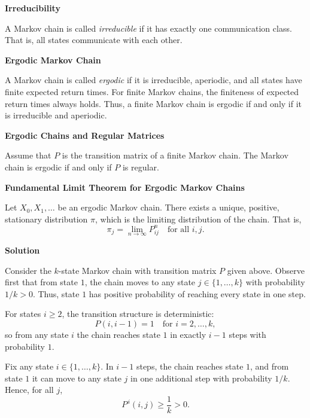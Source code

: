 \documentclass[hidelinks]{article}
\begin{document}
\medskip

{\noindent \color{darkgreen}
\textbf{Irreducibility}

\noindent A Markov chain is called \emph{irreducible} if it has exactly one communication class. 
That is, all states communicate with each other.
}

\medskip

{\noindent \color{darkgreen}
\textbf{Ergodic Markov Chain}

\noindent A Markov chain is called \emph{ergodic} if it is irreducible, aperiodic, and all states have finite expected return times. 
For finite Markov chains, the finiteness of expected return times always holds. 
Thus, a finite Markov chain is ergodic if and only if it is irreducible and aperiodic.
}

\medskip

{\color{darkgreen}

\noindent \textbf{Ergodic Chains and Regular Matrices}

\noindent Assume that $P$ is the transition matrix of a finite Markov chain.
The Markov chain is ergodic if and only if $P$ is regular.
}

\medskip

{\noindent \color{darkgreen}
\textbf{Fundamental Limit Theorem for Ergodic Markov Chains}

\noindent Let $X_0, X_1, \dots$ be an ergodic Markov chain. There exists a unique, positive, stationary distribution $\pi$, which is the limiting distribution of the chain. That is,
\[
\pi_j = \lim_{n \to \infty} P_{ij}^n \quad \text{for all } i,j.
\]
}

\noindent \textbf{Solution}

\noindent Consider the $k$-state Markov chain with transition matrix $P$ given above.
Observe first that from state $1$, the chain moves to any state
$j \in \{1,\dots,k\}$ with probability $1/k > 0$. Thus, state $1$ has
positive probability of reaching every state in one step.

\smallskip

\noindent For states $i \ge 2$, the transition structure is deterministic:
\[
P(i,i-1) = 1 \quad \text{for } i=2,\dots,k,
\]
so from any state $i$ the chain reaches state $1$ in exactly $i-1$ steps
with probability $1$.

\smallskip

\noindent Fix any state $i \in \{1,\dots,k\}$. In $i-1$ steps, the chain reaches
state $1$, and from state $1$ it can move to any state $j$ in one
additional step with probability $1/k$. Hence, for all $j$,
\[
P^{\,i}(i,j) \ge \frac{1}{k} > 0.
\]
\end{document}
